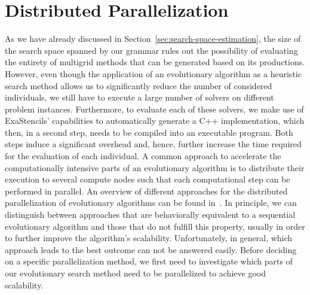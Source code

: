 \section{Distributed Parallelization}
\label{sec:distributed-parallelization}
As we have already discussed in Section~\ref{sec:search-space-estimation}, the size of the search space spanned by our grammar rules out the possibility of evaluating the entirety of multigrid methods that can be generated based on its productions.
However, even though the application of an evolutionary algorithm as a heuristic search method allows us to significantly reduce the number of considered individuals, we still have to execute a large number of solvers on different problem instances.
Furthermore, to evaluate each of these solvers, we make use of ExaStencils' capabilities to automatically generate a C++ implementation, which then, in a second step, needs to be compiled into an executable program.
Both steps induce a significant overhead and, hence, further increase the time required for the evaluation of each individual.
A common approach to accelerate the computationally intensive parts of an evolutionary algorithm is to distribute their execution to several compute nodes such that each computational step can be performed in parallel.
An overview of different approaches for the distributed parallelization of evolutionary algorithms can be found in~\cite{gong2015distributed}.
In principle, we can distinguish between approaches that are behaviorally equivalent to a sequential evolutionary algorithm and those that do not fulfill this property, usually in order to further improve the algorithm's scalability.
Unfortunately, in general, which approach leads to the best outcome can not be answered easily.
Before deciding on a specific parallelization method, we first need to investigate which parts of our evolutionary search method need to be parallelized to achieve good scalability.

